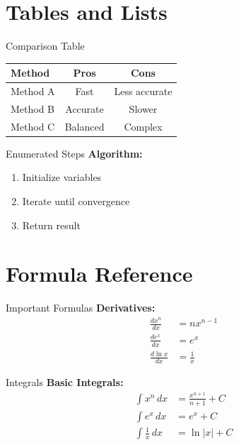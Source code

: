 \documentclass[a4paper, fontsize=7pt]{scrartcl}
\def\dx{\,dx}
\newcommand{\ddx}[1]{\frac{d#1}{dx}}
\renewcommand*{\arraystretch}{1.5}  %
\begin{document}
\section{Tables and Lists}

\begin{mainbox}{Comparison Table}
\renewcommand*{\arraystretch}{1.4}
\begin{center}
\begin{tabular}{l|c|c}
\textbf{Method} & \textbf{Pros} & \textbf{Cons} \\
\hline
Method A & Fast & Less accurate \\
Method B & Accurate & Slower \\
Method C & Balanced & Complex \\
\end{tabular}
\end{center}
\end{mainbox}

\begin{subbox}{Enumerated Steps}
\textbf{Algorithm:}
\begin{enumerate}
    \item Initialize variables
    \item Iterate until convergence
    \item Return result
\end{enumerate}
\end{subbox}

\section{Formula Reference}

\begin{mainbox}{Important Formulas}
\textbf{Derivatives:}
\begin{align*}
\ddx{x^n} &= nx^{n-1} \\
\ddx{e^x} &= e^x \\
\ddx{\ln x} &= \frac{1}{x}
\end{align*}
\end{mainbox}

\begin{mainbox}{Integrals}
\textbf{Basic Integrals:}
\begin{align*}
\int x^n \dx &= \frac{x^{n+1}}{n+1} + C \\
\int e^x \dx &= e^x + C \\
\int \frac{1}{x} \dx &= \ln|x| + C
\end{align*}
\end{mainbox}
\end{document}
